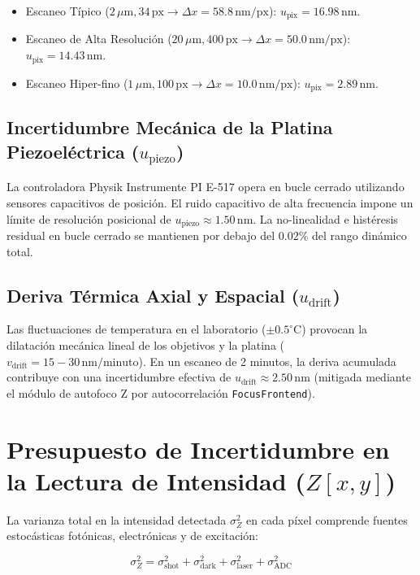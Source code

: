\documentclass[11pt,a4paper]{article}
\begin{document}
\begin{itemize}[leftmargin=*]
    \item Escaneo Típico ($2\,\mu\text{m}, 34\,\text{px} \rightarrow \Delta x = 58.8\,\text{nm/px}$): $u_{\text{pix}} = 16.98\,\text{nm}$.
    \item Escaneo de Alta Resolución ($20\,\mu\text{m}, 400\,\text{px} \rightarrow \Delta x = 50.0\,\text{nm/px}$): $u_{\text{pix}} = 14.43\,\text{nm}$.
    \item Escaneo Hiper-fino ($1\,\mu\text{m}, 100\,\text{px} \rightarrow \Delta x = 10.0\,\text{nm/px}$): $u_{\text{pix}} = 2.89\,\text{nm}$.
\end{itemize}

\subsection{Incertidumbre Mecánica de la Platina Piezoeléctrica ($u_{\text{piezo}}$)}
La controladora Physik Instrumente PI E-517 opera en bucle cerrado utilizando sensores capacitivos de posición. El ruido capacitivo de alta frecuencia impone un límite de resolución posicional de $u_{\text{piezo}} \approx 1.50\,\text{nm}$. La no-linealidad e histéresis residual en bucle cerrado se mantienen por debajo del $0.02\%$ del rango dinámico total.

\subsection{Deriva Térmica Axial y Espacial ($u_{\text{drift}}$)}
Las fluctuaciones de temperatura en el laboratorio ($\pm 0.5^\circ\text{C}$) provocan la dilatación mecánica lineal de los objetivos y la platina ($v_{\text{drift}} = 15 - 30\,\text{nm/minuto}$). En un escaneo de 2 minutos, la deriva acumulada contribuye con una incertidumbre efectiva de $u_{\text{drift}} \approx 2.50\,\text{nm}$ (mitigada mediante el módulo de autofoco Z por autocorrelación \texttt{FocusFrontend}).

\section{Presupuesto de Incertidumbre en la Lectura de Intensidad ($Z[x,y]$)}

La varianza total en la intensidad detectada $\sigma_Z^2$ en cada píxel comprende fuentes estocásticas fotónicas, electrónicas y de excitación:

\begin{equation}
    \sigma_Z^2 = \sigma_{\text{shot}}^2 + \sigma_{\text{dark}}^2 + \sigma_{\text{laser}}^2 + \sigma_{\text{ADC}}^2
\end{equation}
\end{document}
